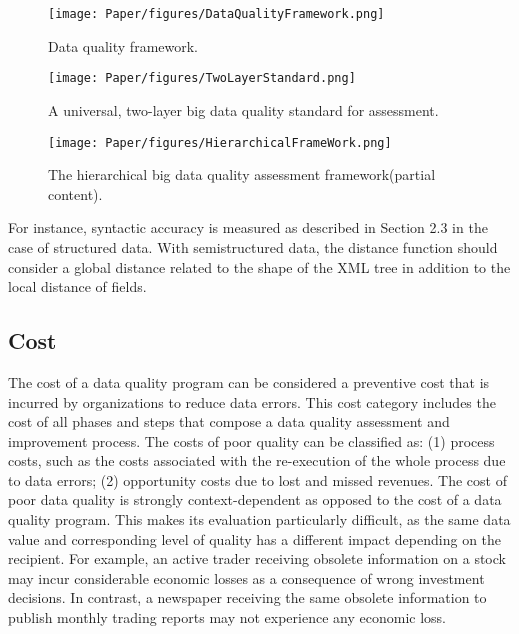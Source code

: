 \documentclass[pdftex,english,oribibl]{llncs}
\begin{document}
  \begin{figure}
    \centering
    \texttt{[image: Paper/figures/DataQualityFramework.png]}
    \caption{Data quality framework.}
    \label{fig:dataqualityframework}
  \end{figure}

  \begin{figure}
    \centering
    \texttt{[image: Paper/figures/TwoLayerStandard.png]}
    \caption{A universal, two-layer big data quality standard for assessment.}
    \label{fig:twolayerstandard}
  \end{figure}

\begin{figure}
    \centering
    \texttt{[image: Paper/figures/HierarchicalFrameWork.png]}
    \caption{The hierarchical big data quality assessment framework(partial content).}
    \label{fig:hierachicalframwork}
 \end{figure}

 For instance, syntactic accuracy is measured as described in Section 2.3 in the case of structured data. With semistructured data, the distance function should consider a global distance related to the shape of the XML tree in addition to the local distance of fields.


\subsection{Cost}
The cost of a data quality program can be considered a preventive cost that is incurred by organizations to reduce data errors. This cost category includes the cost of all phases and steps that compose a data quality assessment and improvement process.
 The costs of poor quality can be classified as:
 (1) process costs, such as the costs associated with the re-execution of the whole process due to data errors;
 (2) opportunity costs due to lost and missed revenues.
 The cost of poor data quality is strongly context-dependent as opposed to the cost of a data quality program. This makes its evaluation particularly difficult, as the same data value and corresponding level of quality has a different impact depending on the recipient. For example, an active trader receiving obsolete information on a stock may incur considerable economic losses as a consequence of wrong investment decisions. In contrast, a newspaper receiving the same obsolete information to publish monthly trading reports may not experience any economic loss.
\end{document}

